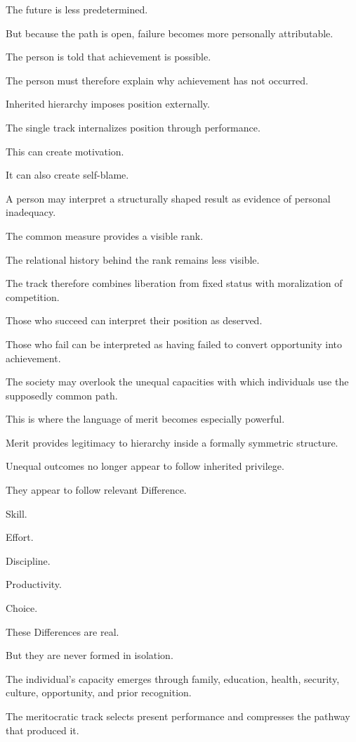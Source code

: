 The future is less predetermined.

But because the path is open, failure becomes more personally attributable.

The person is told that achievement is possible.

The person must therefore explain why achievement has not occurred.

Inherited hierarchy imposes position externally.

The single track internalizes position through performance.

This can create motivation.

It can also create self-blame.

A person may interpret a structurally shaped result as evidence of personal inadequacy.

The common measure provides a visible rank.

The relational history behind the rank remains less visible.

The track therefore combines liberation from fixed status with moralization of competition.

Those who succeed can interpret their position as deserved.

Those who fail can be interpreted as having failed to convert opportunity into achievement.

The society may overlook the unequal capacities with which individuals use the supposedly common path.

This is where the language of merit becomes especially powerful.

Merit provides legitimacy to hierarchy inside a formally symmetric structure.

Unequal outcomes no longer appear to follow inherited privilege.

They appear to follow relevant Difference.

Skill.

Effort.

Discipline.

Productivity.

Choice.

These Differences are real.

But they are never formed in isolation.

The individual’s capacity emerges through family, education, health, security, culture, opportunity, and prior recognition.

The meritocratic track selects present performance and compresses the pathway that produced it.

